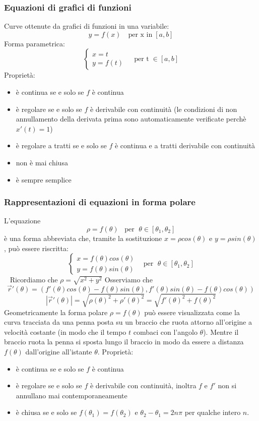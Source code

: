 \subsubsection{Equazioni di grafici di funzioni}
Curve ottenute da grafici di funzioni in una variabile:
\[
    y = f(x) \quad\text{per x in} \;[a,b]
\]
Forma parametrica:
\[
    \begin{cases}
        x=t \\
        y=f(t)
    \end{cases} \;\;\;\; \text{per t} \;\in[a,b]
\]
Proprietà:
\begin{itemize}
    \item è continua se e solo se $f$ è continua
    \item è regolare se e solo se $f$ è derivabile con continuità (le condizioni di non annullamento della derivata prima sono automaticamente verificate perchè $x'(t) = 1$)
    \item è regolare a tratti se e solo se $f$ è continua e a tratti derivabile con continuità
    \item non è mai chiusa
    \item è sempre semplice
\end{itemize}
\subsubsection{Rappresentazioni di equazioni in forma polare}
L'equazione
\[
    \rho = f(\theta) \;\;\;\text{per } \; \theta \in [\theta_1, \theta_2]
\]
è una forma abbreviata che, tramite la sostituzione $x= \rho cos(\theta)$ e $y= \rho sin(\theta)$, può essere riscritta:
\[
    \begin{cases}
        x = f(\theta) cos(\theta)\\
        y = f(\theta) sin(\theta)
    \end{cases} \;\;\; \text{per } \; \theta \in [\theta_1, \theta_2]
\]
\ \newline
Ricordiamo che $\rho = \sqrt{x^2 + y^2}$
Osserviamo che 
\[
    \vec{r}'(\theta) = (f'(\theta) cos(\theta)- f(\theta)sin(\theta), f'(\theta) sin(\theta) - f(\theta)cos(\theta))
\]
\[
    |\vec{r}'(\theta)| = \sqrt{\rho(\theta)^2 + \rho'(\theta)^2} = \sqrt{f'(\theta)^2 + f(\theta)^2}
\]
Geometricamente la forma polare $\rho = f(\theta)$ può essere visualizzata come la curva tracciata da una penna posta su un braccio che ruota attorno all'origine a velocità costante (in modo che il tempo $t$ combaci con l'angolo $\theta$). Mentre il braccio ruota la penna si sposta lungo il braccio in modo da essere a distanza $f(\theta)$ dall'origine all'istante $\theta$.\newline
\newline
Proprietà:
\begin{itemize}
    \item è continua se e solo se $f$ è continua
    \item è regolare se e solo se $f$ è derivabile con continuità, inoltra $f$ e $f'$ non si annullano mai contemporaneamente
    \item è chiusa se e solo se $f(\theta_1) = f(\theta_2)$ e $\theta_2 - \theta_1 = 2n\pi$ per qualche intero $n$.
\end{itemize}

